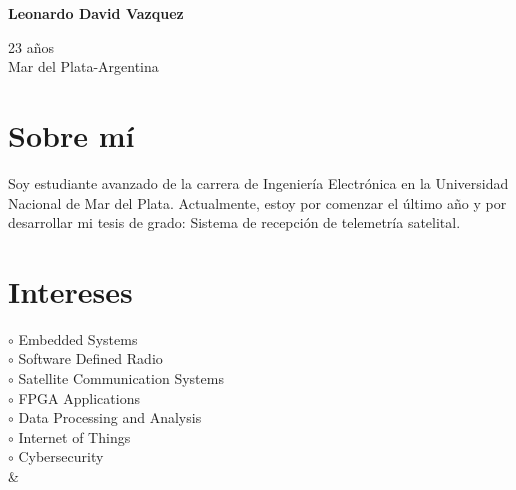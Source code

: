 \documentclass[a4paper,10pt]{article}
\begin{document}
\thispagestyle{empty}

\begin{adjustbox}{valign=t}
\begin{minipage}{0.34\textwidth} 
\begin{center}
\MySkip 	%
{\LARGE \bfseries Leonardo David Vazquez}
\MySkip 	%
\end{center}
23 años\\
Mar del Plata-Argentina

\textcolor{ColorRed}{\faEnvelopeO} 

\textcolor{ColorRed}{\faLinkedin} 

\textcolor{ColorRed}{\faGithub} 

\section*{Sobre mí}
\raggedright
Soy estudiante avanzado de la carrera de Ingeniería Electrónica en la Universidad Nacional de Mar del Plata. Actualmente, estoy por comenzar el último año y por desarrollar mi tesis de grado: Sistema de recepción de telemetría satelital.
\section*{Intereses}
\raggedright
\textcolor{ColorOne}{$\circ$} Embedded Systems\\
\textcolor{ColorOne}{$\circ$} Software Defined Radio\\
\textcolor{ColorOne}{$\circ$} Satellite Communication Systems\\
\textcolor{ColorOne}{$\circ$} FPGA Applications\\
\textcolor{ColorOne}{$\circ$} Data Processing and Analysis\\
\textcolor{ColorOne}{$\circ$} Internet of Things\\
\textcolor{ColorOne}{$\circ$} Cybersecurity\\
&\vfill

\end{minipage}
\end{adjustbox}
\end{document}

